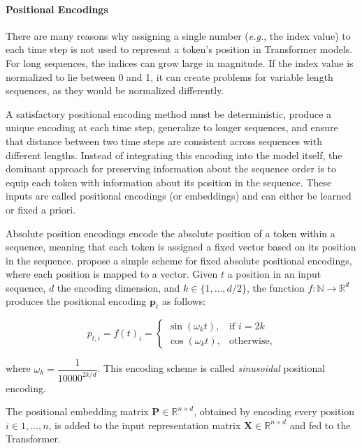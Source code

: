 \paragraph{Positional Encodings} There are many reasons why assigning a single number (\textit{e.g.}, the index value) to each time step is not used to represent a token's position in Transformer models. For long sequences, the indices can grow large in magnitude. If the index value is normalized to lie between 0 and 1, it can create problems for variable length sequences, as they would be normalized differently. 

A satisfactory positional encoding method must be deterministic, produce a unique encoding at each time step, generalize to longer sequences, and ensure that distance between two time steps are consistent across sequences with different lengths. Instead of integrating this encoding into the model itself, the dominant approach for preserving information about the sequence order is to equip each token with information about its position in the sequence. These inputs are called positional encodings (or embeddings) and can either be learned or fixed a priori. %

Absolute position encodings encode the absolute position of a token within a sequence, meaning that each token is assigned a fixed vector based on its position in the sequence. \citet{vaswani2017attention} propose a simple scheme for fixed absolute positional encodings, where each position is mapped to a vector. Given $t$ a position in an input sequence, $d$ the encoding dimension, and $k \in \{1, \ldots, d/2\}$, the function $f: \mathbb{N} \rightarrow \mathbb{R}^d$ produces the positional encoding $\bm{p}_t$ as follows:

\begin{equation}
    p_{t,i} = f(t)_i = 
\begin{cases}
    \sin(\omega_k t), & \text{if } i=2k\\
    \cos(\omega_k t),              & \text{otherwise},
\end{cases}
\end{equation}

where $\omega_k =\dfrac{1}{10000^{2k/d}}$. This encoding scheme is called \textit{sinusoidal} positional encoding.

The positional embedding matrix $\bm{P} \in \mathbb{R}^{n \times d}$, obtained by encoding every position $i \in {1, \ldots, n}$, is added to the input representation matrix $\bm{X} \in \mathbb{R}^{n \times d}$ and fed to the Transformer.

